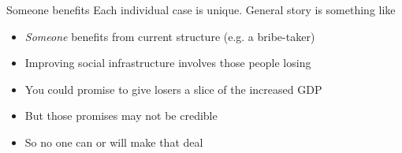\begin{frame}{Someone benefits}
Each individual case is unique. General story is something like
\begin{itemize}
	\item \textit{Someone} benefits from current structure (e.g. a bribe-taker)
	\item Improving social infrastructure involves those people losing
	\item You could promise to give losers a slice of the increased GDP
	\item But those promises may not be credible
	\item So no one can or will make that deal
\end{itemize}
\end{frame}

